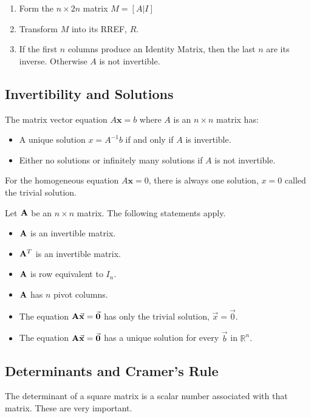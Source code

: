         \begin{enumerate}
        \item Form the $n \times 2n$ matrix $M=\left[A|I\right]$
        \item Transform $M$ into its RREF, $R$.
        \item If the first $n$ columns produce an Identity Matrix, then the last $n$ are its inverse. Otherwise $A$ is not invertible.
        \end{enumerate}

    \subsection{Invertibility and Solutions}
    The matrix vector equation $A\mathbf{x} = b$ where $A$ is an $n \times n$ matrix has:
        \begin{itemize}
        \item A unique solution $x=A^{-1} b$ if and only if $A$ is invertible.
        \item Either no solutions or infinitely many solutions if $A$ is not invertible.
        \end{itemize}

    For the homogeneous equation $A \mathbf{x} = 0$, there is always one solution, $x=0$ called the trivial solution.

    Let $\mathbf{A}$ be an $n \times n$ matrix. The following statements apply.
    \begin{itemize}
        \item $\mathbf{A}$ is an invertible matrix.
        \item $\mathbf{A}^T$ is an invertible matrix.
        \item $\mathbf{A}$ is row equivalent to $I_n$.
        \item $\mathbf{A}$ has $n$ pivot columns.
        \item The equation $\ma \vec{x} = \vec{0}$ has only the trivial solution, $\vec{x}=\vec{0}$.
        \item The equation $\ma \vec{x} = \vec{0}$ has a unique solution for every $\vec{b}$ in $\mathbb{R}^n$.
    \end{itemize}

    \subsection{Determinants and Cramer's Rule}
    The determinant of a square matrix is a scalar number associated with that matrix. These are very important.

